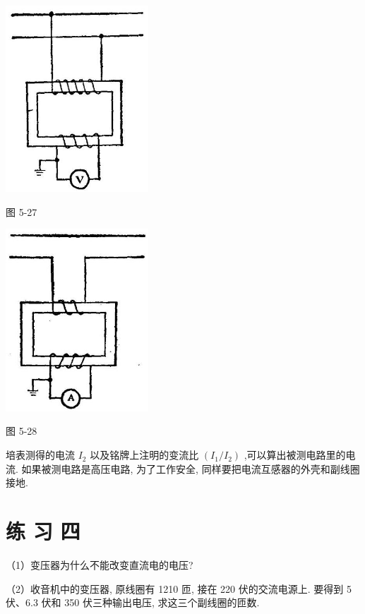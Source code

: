 \documentclass[10pt]{article}
\begin{document}
\begin{center}
\includegraphics[max width=0.4\textwidth]{images/01913056-1f15-74d8-9184-9aab52c9d66b_184_996697.jpg}
\end{center}

图 5-27

\begin{center}
\includegraphics[max width=0.4\textwidth]{images/01913056-1f15-74d8-9184-9aab52c9d66b_184_411890.jpg}
\end{center}

图 5-28

培表测得的电流 \({I}_{2}\) 以及铭牌上注明的变流比 \(\left( {{I}_{1}/{I}_{2}}\right)\) ,可以算出被测电路里的电流. 如果被测电路是高压电路, 为了工作安全, 同样要把电流互感器的外壳和副线圈接地.

\section*{练 习 四}

（1）变压器为什么不能改变直流电的电压?

（2）收音机中的变压器, 原线圈有 1210 匝, 接在 220 伏的交流电源上. 要得到 5 伏、6.3 伏和 350 伏三种输出电压, 求这三个副线圈的匝数.
\end{document}

